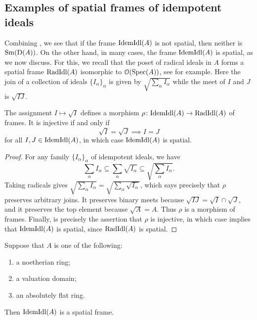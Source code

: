 \documentclass{amsart}
\begin{document}
    \subsection{Examples of spatial frames of idempotent ideals}
        Combining , we see that if the frame $\mathrm{IdemIdl}(A)$ is not spatial, then neither is $\operatorname{Sm}(\operatorname{D}(A))$. On the other hand, in many cases, the frame $\mathrm{IdemIdl}(A)$ is spatial, as we now discuss. For this, we recall that the poset of radical ideals in $A$ forms a spatial frame $\operatorname{RadIdl}(A)$ isomorphic to $\mathcal{O}(\operatorname{Spec}(A))$, see \cite[Section 1.3]{KockPitsch2017Hochster} for example. Here the join of a collection of ideals $\{ I_{\alpha} \}_{\alpha}$ is given by $\sqrt{\sum_{\alpha}I_{\alpha}}$ while the meet of $I$ and $J$ is $\sqrt{IJ}$. 
    \begin{Lem}
        The assignment $I \mapsto \sqrt{I}$ defines a morphism $\rho \colon \mathrm{IdemIdl}(A) \to \operatorname{RadIdl}(A)$ of frames. It is injective if and only if
        \begin{equation}\label{eq:spatial-condition}
            \sqrt{I} = \sqrt{J} \implies I = J
        \end{equation}
        for all $I,J \in \mathrm{IdemIdl}(A)$, in which case $\mathrm{IdemIdl}(A)$ is spatial.
    \end{Lem}
    \begin{proof}
        For any family $\{I_\alpha\}_\alpha$ of idempotent ideals, we have
        \[
            \sum_\alpha I_\alpha\subseteq\sum_\alpha\sqrt{I_\alpha}\subseteq\sqrt{\sum_\alpha I_\alpha}.
        \]
        Taking radicals gives $\sqrt{\sum_\alpha I_\alpha}=\sqrt{\sum_\alpha\sqrt{I_\alpha}}$, which says precisely that $\rho$ preserves arbitrary joins. It preserves binary meets because $\sqrt{IJ}=\sqrt I\cap\sqrt J$, and it preserves the top element because $\sqrt A=A$. Thus $\rho$ is a morphism of frames. Finally,  is precisely the assertion that $\rho$ is injective, in which case  implies that $\mathrm{IdemIdl}(A)$ is spatial, since $\operatorname{RadIdl}(A)$ is spatial.
    \end{proof}
    \begin{Prop}\label{prop:E(A)-spatial}
        Suppose that $A$ is one of the following:
        \begin{enumerate}
            \item a noetherian ring;
            \item a valuation domain; 
            \item an absolutely flat ring. 
        \end{enumerate}
        Then $\mathrm{IdemIdl}(A)$ is a spatial frame. 
    \end{Prop}
\end{document}
